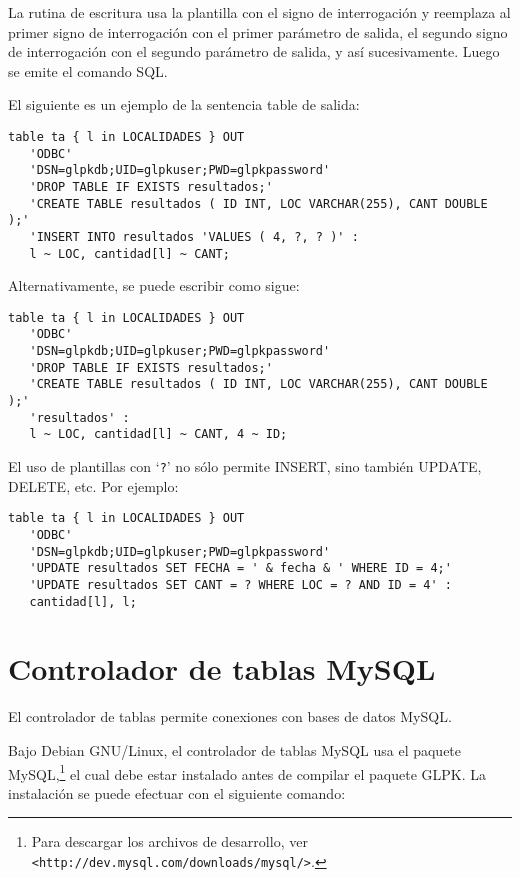 \documentclass[11pt,spanish]{report}
\def\para#1{\noindent{\bf#1}}
\begin{document}
La rutina de escritura usa la plantilla con el signo de interrogación y reemplaza al primer signo de interrogación con el primer parámetro de salida, el segundo signo de interrogación con el segundo parámetro de salida, y así sucesivamente. Luego se emite el comando SQL.

El siguiente es un ejemplo de la sentencia table de salida:

\begin{verbatim}
table ta { l in LOCALIDADES } OUT
   'ODBC'
   'DSN=glpkdb;UID=glpkuser;PWD=glpkpassword'
   'DROP TABLE IF EXISTS resultados;'
   'CREATE TABLE resultados ( ID INT, LOC VARCHAR(255), CANT DOUBLE );'
   'INSERT INTO resultados 'VALUES ( 4, ?, ? )' :
   l ~ LOC, cantidad[l] ~ CANT;
\end{verbatim}

\noindent
Alternativamente, se puede escribir como sigue:

\begin{verbatim}
table ta { l in LOCALIDADES } OUT
   'ODBC'
   'DSN=glpkdb;UID=glpkuser;PWD=glpkpassword'
   'DROP TABLE IF EXISTS resultados;'
   'CREATE TABLE resultados ( ID INT, LOC VARCHAR(255), CANT DOUBLE );'
   'resultados' :
   l ~ LOC, cantidad[l] ~ CANT, 4 ~ ID;
\end{verbatim}

El uso de plantillas con `\verb|?|' no sólo permite INSERT, sino también UPDATE, DELETE, etc. Por ejemplo:

\begin{verbatim}
table ta { l in LOCALIDADES } OUT
   'ODBC'
   'DSN=glpkdb;UID=glpkuser;PWD=glpkpassword'
   'UPDATE resultados SET FECHA = ' & fecha & ' WHERE ID = 4;'
   'UPDATE resultados SET CANT = ? WHERE LOC = ? AND ID = 4' :
   cantidad[l], l;
\end{verbatim}

\section{Controlador de tablas MySQL}

El controlador de tablas permite conexiones con bases de datos MySQL.

\para{Debian GNU/Linux.}
Bajo Debian GNU/Linux, el controlador de tablas MySQL usa el paquete MySQL,\footnote{Para descargar los archivos de desarrollo, ver
{\tt<http://dev.mysql.com/downloads/mysql/>}.} el cual debe estar instalado antes de compilar el paquete GLPK. La instalación se puede efectuar con el siguiente comando:
\end{document}
